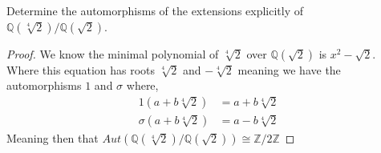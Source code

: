 \documentclass[11pt]{article}
\newenvironment{problem}[2][Problem\!]{\begin{tcolorbox}\begin{trivlist}
\item[\hskip \labelsep {\bfseries #1}\hskip \labelsep {\bfseries #2}]}{\end{trivlist}\end{tcolorbox}}
\newcommand{\zz}{\mathbb Z}   %
\newcommand{\qq}{\mathbb Q}   %
\begin{document}
\begin{problem}{14.1.5}
  Determine the automorphisms of the extensions explicitly of \\ $\qq(\sqrt[4]{2})/\qq(\sqrt{2})$.
\end{problem}
\begin{proof}
  We know the minimal polynomial of $\sqrt[4]{2}$ over $\qq(\sqrt{2})$ is $x^{2} - \sqrt{2}$. Where this equation has roots $\sqrt[4]{2}$ and $-\sqrt[4]{2}$ meaning we have the automorphisms $1$ and $\sigma$ where,
  \begin{align*}
    1(a+b\sqrt[4]{2}) &= a + b\sqrt[4]{2} \\
    \sigma(a + b\sqrt[4]{2}) &= a-b\sqrt[4]{2}
  \end{align*}
  Meaning then that $Aut(\qq(\sqrt[4]{2})/\qq(\sqrt{2}))\cong \zz/2\zz$
\end{proof}

\vspace*{20pt}
\end{document}
